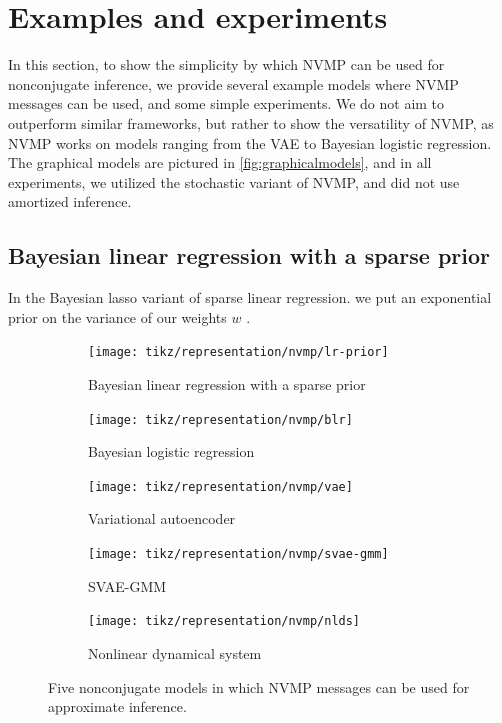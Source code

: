 \section{Examples and experiments}
\label{sec:examples}

In this section, to show the simplicity by
which NVMP can be used for nonconjugate inference,
we provide several example models 
where NVMP messages can be used, and some simple
experiments. We do not aim to outperform
similar frameworks, but rather to show the versatility of NVMP, as NVMP works on models ranging from the VAE to Bayesian logistic regression.
The graphical models are pictured in \autoref{fig:graphicalmodels},
and in all experiments, we utilized the stochastic variant
of NVMP, and did not use amortized inference.

\subsection{Bayesian linear regression with a sparse prior}

In the Bayesian lasso variant of sparse linear regression.
we put an exponential prior on the variance of our weights $w$ \citep{Park2008}.

\begin{figure}
    \centering
    \begin{subfigure}[t]{0.19\textwidth}
        \centering
        \texttt{[image: tikz/representation/nvmp/lr-prior]}
        \caption{Bayesian linear regression with a sparse prior}
    \end{subfigure}
    \hfill
    \begin{subfigure}[t]{0.19\textwidth}
        \centering
        \texttt{[image: tikz/representation/nvmp/blr]}
        \caption{Bayesian logistic regression}
    \end{subfigure}
    \hfill
    \begin{subfigure}[t]{0.19\textwidth}
        \centering
        \texttt{[image: tikz/representation/nvmp/vae]}
        \caption{Variational autoencoder}
    \end{subfigure}
    \begin{subfigure}[t]{0.19\textwidth}
        \centering
        \texttt{[image: tikz/representation/nvmp/svae-gmm]}
        \caption{SVAE-GMM}
    \end{subfigure}
    \begin{subfigure}[t]{0.19\textwidth}
        \centering
        \texttt{[image: tikz/representation/nvmp/nlds]}
        \caption{Nonlinear dynamical system}
    \end{subfigure}
    \caption{Five nonconjugate models in which NVMP messages can be used for approximate inference.}
    \label{fig:graphicalmodels}
\end{figure}


